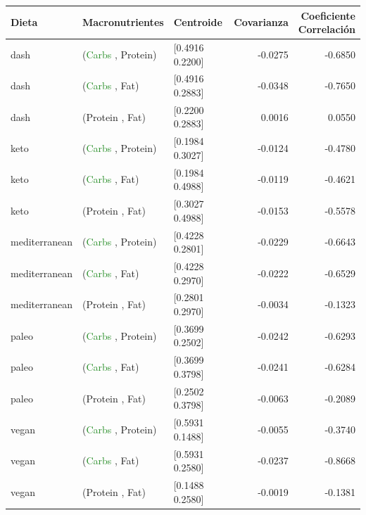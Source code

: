 \documentclass[12pt,a4paper]{article}
\begin{document}
{        \begin{center}
            \begin{tabular}{lllrr}
            \toprule
                Dieta & Macronutrientes & Centroide & Covarianza & \makecell{Coeficiente\\Correlación} \\
            \midrule
                dash          & (\textcolor{ForestGreen}{Carbs} , \textcolor{BrickRed}{Protein}) & [0.4916 0.2200] & -0.0275 & -0.6850 \\
                dash          & (\textcolor{ForestGreen}{Carbs} , \textcolor{YellowOrange}{Fat})     & [0.4916 0.2883] & -0.0348 & -0.7650 \\
                dash          & (\textcolor{BrickRed}{Protein}  , \textcolor{YellowOrange}{Fat})   & [0.2200 0.2883] &  0.0016 &  0.0550 \\
                keto          & (\textcolor{ForestGreen}{Carbs} , \textcolor{BrickRed}{Protein}) & [0.1984 0.3027] & -0.0124 & -0.4780 \\
                keto          & (\textcolor{ForestGreen}{Carbs} , \textcolor{YellowOrange}{Fat})     & [0.1984 0.4988] & -0.0119 & -0.4621 \\
                keto          & (\textcolor{BrickRed}{Protein}  , \textcolor{YellowOrange}{Fat})   & [0.3027 0.4988] & -0.0153 & -0.5578 \\
                mediterranean & (\textcolor{ForestGreen}{Carbs} , \textcolor{BrickRed}{Protein}) & [0.4228 0.2801] & -0.0229 & -0.6643 \\
                mediterranean & (\textcolor{ForestGreen}{Carbs} , \textcolor{YellowOrange}{Fat})     & [0.4228 0.2970] & -0.0222 & -0.6529 \\
                mediterranean & (\textcolor{BrickRed}{Protein}  , \textcolor{YellowOrange}{Fat})   & [0.2801 0.2970] & -0.0034 & -0.1323 \\
                paleo         & (\textcolor{ForestGreen}{Carbs} , \textcolor{BrickRed}{Protein}) & [0.3699 0.2502] & -0.0242 & -0.6293 \\
                paleo         & (\textcolor{ForestGreen}{Carbs} , \textcolor{YellowOrange}{Fat})     & [0.3699 0.3798] & -0.0241 & -0.6284 \\
                paleo         & (\textcolor{BrickRed}{Protein}  , \textcolor{YellowOrange}{Fat})   & [0.2502 0.3798] & -0.0063 & -0.2089 \\
                vegan         & (\textcolor{ForestGreen}{Carbs} , \textcolor{BrickRed}{Protein}) & [0.5931 0.1488] & -0.0055 & -0.3740 \\
                vegan         & (\textcolor{ForestGreen}{Carbs} , \textcolor{YellowOrange}{Fat})     & [0.5931 0.2580] & -0.0237 & -0.8668 \\
                vegan         & (\textcolor{BrickRed}{Protein}  , \textcolor{YellowOrange}{Fat})   & [0.1488 0.2580] & -0.0019 & -0.1381 \\
            \bottomrule
            \end{tabular}
        \end{center}
        
}
\end{document}
